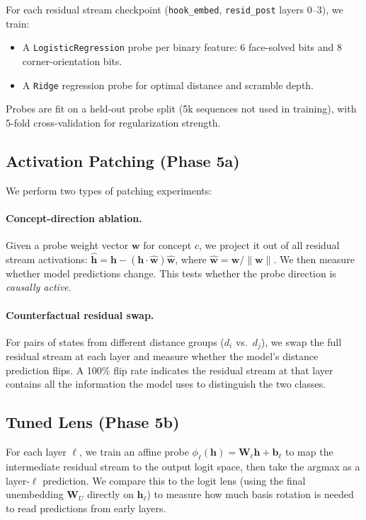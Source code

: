 \documentclass[12pt]{article}
\begin{document}
For each residual stream checkpoint
(\texttt{hook\_embed}, \texttt{resid\_post} layers 0--3), we train:
\begin{itemize}
  \item A \texttt{LogisticRegression} probe per binary feature: 6 face-solved
        bits and 8 corner-orientation bits.
  \item A \texttt{Ridge} regression probe for optimal distance and scramble depth.
\end{itemize}
Probes are fit on a held-out probe split (5k sequences not used in training),
with 5-fold cross-validation for regularization strength.

\subsection{Activation Patching (Phase 5a)}
\label{sec:patch}

We perform two types of patching experiments:

\paragraph{Concept-direction ablation.}
Given a probe weight vector $\mathbf{w}$ for concept $c$, we project it out of
all residual stream activations:
$\hat{\mathbf{h}} = \mathbf{h} - (\mathbf{h} \cdot \hat{\mathbf{w}})\hat{\mathbf{w}}$,
where $\hat{\mathbf{w}} = \mathbf{w}/\|\mathbf{w}\|$.  We then measure whether
model predictions change.  This tests whether the probe direction is
\emph{causally active}.

\paragraph{Counterfactual residual swap.}
For pairs of states from different distance groups ($d_i$ vs.\ $d_j$), we swap
the full residual stream at each layer and measure whether the model's distance
prediction flips.  A 100\% flip rate indicates the residual stream at that layer
contains all the information the model uses to distinguish the two classes.

\subsection{Tuned Lens (Phase 5b)}

For each layer $\ell$, we train an affine probe
$\phi_\ell(\mathbf{h}) = \mathbf{W}_\ell \mathbf{h} + \mathbf{b}_\ell$
to map the intermediate residual stream to the output logit space, then take the
argmax as a layer-$\ell$ prediction.  We compare this to the logit lens (using
the final unembedding $\mathbf{W}_U$ directly on $\mathbf{h}_\ell$) to measure
how much basis rotation is needed to read predictions from early layers.
\end{document}
